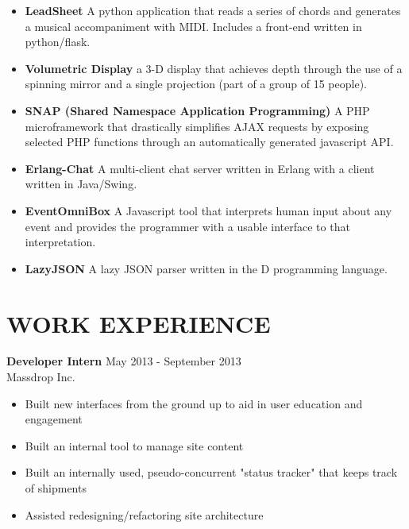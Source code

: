 \documentclass[line,margin]{res}
\begin{document}
\begin{resume}
\begin{itemize} \itemsep -2pt


\item {\bf LeadSheet} A python application that reads a series of chords and 
   generates a musical accompaniment with MIDI. Includes a front-end written in 
   python/flask. 

\item {\bf Volumetric Display} a 3-D display that achieves depth through the 
   use of a spinning mirror and a single projection 
   (part of a group of 15 people).

\item {\bf SNAP (Shared Namespace Application Programming)} 
   A PHP microframework that drastically simplifies AJAX requests by 
   exposing selected PHP functions through an automatically generated
   javascript API.




\item {\bf Erlang-Chat}   A multi-client chat server written in Erlang with a 
   client written in Java/Swing.

\item {\bf EventOmniBox}  A Javascript tool that interprets human input about 
   any event and provides the programmer with a usable interface to that 
   interpretation.


\item {\bf LazyJSON}  A lazy JSON parser written in the D programming language.


\end{itemize}
 
\section{WORK EXPERIENCE} 
			   {\bf Developer Intern} \hfill May 2013 - September 2013\\
			   Massdrop Inc.
			   \begin{itemize} \itemsep -2pt
				  \item Built new interfaces from the ground up to aid in user education and engagement
				  \item Built an internal tool to manage site content
				  \item Built an internally used, pseudo-concurrent "status tracker" that keeps track
					 of shipments
				  \item Assisted redesigning/refactoring site architecture
			   \end{itemize}


\end{resume}
\end{document}

